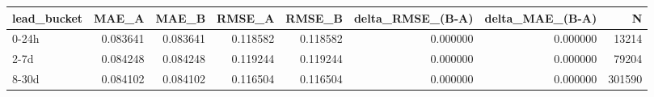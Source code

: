 \begin{tabular}{lrrrrrrr}
\toprule
lead_bucket & MAE_A & MAE_B & RMSE_A & RMSE_B & delta_RMSE_(B-A) & delta_MAE_(B-A) & N \\
\midrule
0-24h & 0.083641 & 0.083641 & 0.118582 & 0.118582 & 0.000000 & 0.000000 & 13214 \\
2-7d & 0.084248 & 0.084248 & 0.119244 & 0.119244 & 0.000000 & 0.000000 & 79204 \\
8-30d & 0.084102 & 0.084102 & 0.116504 & 0.116504 & 0.000000 & 0.000000 & 301590 \\
\bottomrule
\end{tabular}
